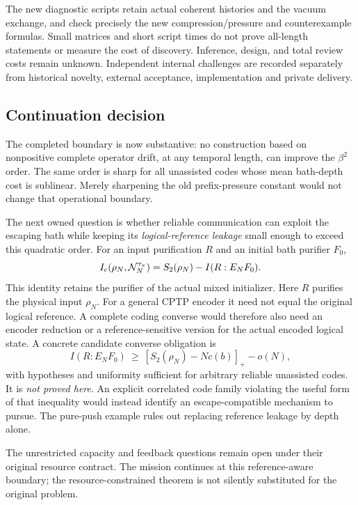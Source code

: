 \documentclass[11pt]{article}
\newcommand{\Ic}{I_{\rm c}}
\begin{document}
The new diagnostic scripts retain actual coherent histories and the
vacuum exchange, and check precisely the new compression/pressure and
counterexample formulas. Small matrices and short script times do not
prove all-length statements or measure the cost of discovery.
Inference, design, and total review costs remain unknown.
Independent internal challenges are recorded separately from historical
novelty, external acceptance, implementation and private delivery.

\subsection{Continuation decision}

The completed boundary is now substantive: no construction based on
nonpositive complete operator drift, at any temporal length, can improve
the \(\beta^2\) order. The same order is sharp for all unassisted codes
whose mean bath-depth cost is sublinear. Merely sharpening the old
prefix-pressure constant would not change that operational boundary.

The next owned question is whether reliable communication can exploit
the escaping bath while keeping its \emph{logical-reference leakage}
small enough to exceed this quadratic order.
For an input purification \(R\) and an initial bath purifier \(F_0\),
\[
 \Ic(\rho_N,\mathcal N_N^{\tau_\pi})
 =S_2(\rho_N)-I(R:E_NF_0).
\]
This identity retains the purifier of the actual mixed initializer.
Here \(R\) purifies the physical input \(\rho_N\). For a general CPTP
encoder it need not equal the original logical reference. A complete
coding converse would therefore also need an encoder reduction or a
reference-sensitive version for the actual encoded logical state.
A concrete candidate converse obligation is
\[
 I(R:E_NF_0)\ \ge\
 [S_2(\rho_N)-Nc(b)]_+-o(N),
\]
with hypotheses and uniformity sufficient for arbitrary reliable
unassisted codes. It is \emph{not proved here}. An explicit correlated
code family violating the useful form of that inequality would instead
identify an escape-compatible mechanism to pursue. The pure-push
example rules out replacing reference leakage by depth alone.

The unrestricted capacity and feedback questions remain open under
their original resource contract. The mission continues at this
reference-aware boundary; the resource-constrained theorem is not
silently substituted for the original problem.

\appendix

\end{document}
